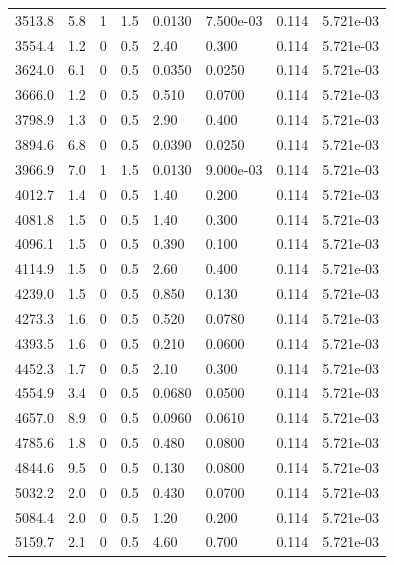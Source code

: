 \documentclass[preview]{standalone}
\begin{document}
{{{\begin{tabular}{L{1.2cm}C{1.2cm} C{0.3cm}C{0.5cm} C{1.4cm}C{1.4cm} C{1.4cm}C{1.4cm}}
  3513.8  &   5.8  & 1     & 1.5 &  0.0130  & 7.500e-03  & 0.114 &  5.721e-03   \\ 
  3554.4  &   1.2  & 0     & 0.5 &  2.40  & 0.300  & 0.114 &  5.721e-03   \\ 
  3624.0  &   6.1  & 0     & 0.5 &  0.0350  & 0.0250  & 0.114 &  5.721e-03   \\ 
  3666.0  &   1.2  & 0     & 0.5 &  0.510  & 0.0700  & 0.114 &  5.721e-03   \\ 
  3798.9  &   1.3  & 0     & 0.5 &  2.90  & 0.400  & 0.114 &  5.721e-03   \\ 
  3894.6  &   6.8  & 0     & 0.5 &  0.0390  & 0.0250  & 0.114 &  5.721e-03   \\ 
  3966.9  &   7.0  & 1     & 1.5 &  0.0130  & 9.000e-03  & 0.114 &  5.721e-03   \\ 
  4012.7  &   1.4  & 0     & 0.5 &  1.40  & 0.200  & 0.114 &  5.721e-03   \\ 
  4081.8  &   1.5  & 0     & 0.5 &  1.40  & 0.300  & 0.114 &  5.721e-03   \\ 
  4096.1  &   1.5  & 0     & 0.5 &  0.390  & 0.100  & 0.114 &  5.721e-03   \\ 
  4114.9  &   1.5  & 0     & 0.5 &  2.60  & 0.400  & 0.114 &  5.721e-03   \\ 
  4239.0  &   1.5  & 0     & 0.5 &  0.850  & 0.130  & 0.114 &  5.721e-03   \\ 
  4273.3  &   1.6  & 0     & 0.5 &  0.520  & 0.0780  & 0.114 &  5.721e-03   \\ 
  4393.5  &   1.6  & 0     & 0.5 &  0.210  & 0.0600  & 0.114 &  5.721e-03   \\ 
  4452.3  &   1.7  & 0     & 0.5 &  2.10  & 0.300  & 0.114 &  5.721e-03   \\ 
  4554.9  &   3.4  & 0     & 0.5 &  0.0680  & 0.0500  & 0.114 &  5.721e-03   \\ 
  4657.0  &   8.9  & 0     & 0.5 &  0.0960  & 0.0610  & 0.114 &  5.721e-03   \\ 
  4785.6  &   1.8  & 0     & 0.5 &  0.480  & 0.0800  & 0.114 &  5.721e-03   \\ 
  4844.6  &   9.5  & 0     & 0.5 &  0.130  & 0.0800  & 0.114 &  5.721e-03   \\ 
  5032.2  &   2.0  & 0     & 0.5 &  0.430  & 0.0700  & 0.114 &  5.721e-03   \\ 
  5084.4  &   2.0  & 0     & 0.5 &  1.20  & 0.200  & 0.114 &  5.721e-03   \\ 
  5159.7  &   2.1  & 0     & 0.5 &  4.60  & 0.700  & 0.114 &  5.721e-03   \\ 

\end{tabular}}}}
\end{document}
